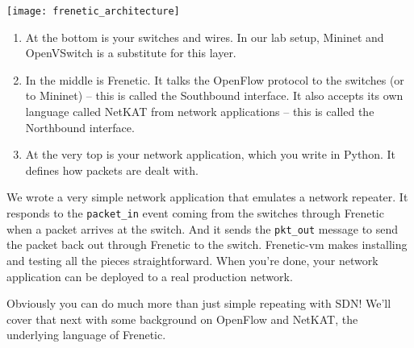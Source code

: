 \texttt{[image: frenetic\_architecture]}

\begin{enumerate}
\item At the bottom is your switches and wires.  In our lab setup, Mininet and OpenVSwitch is a substitute for this layer.
\item In the middle is Frenetic.  It talks the OpenFlow protocol to the switches (or to Mininet) -- this is called the Southbound interface.  It also accepts its own language called NetKAT from network applications -- this is called the Northbound interface.
\item At the very top is your network application, which you write in Python.  It defines how packets are dealt with.
\end{enumerate}

We wrote a very simple network application that emulates a network repeater.   
It responds to the \lstinline{packet_in} event coming from the switches through Frenetic when a packet 
arrives at the switch.  
And it sends the \lstinline{pkt_out} message to send the packet back out through Frenetic to the switch.  
Frenetic-vm makes installing and testing all the pieces straightforward. 
When you're done, your network application can be deployed to a real production network.

Obviously you can do much more than just simple repeating with SDN!  
We'll cover that next with some background on OpenFlow and NetKAT, the underlying language of Frenetic. 